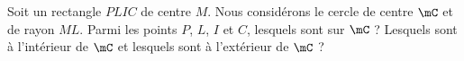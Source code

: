 
\begin{exercice}\label{exo2smath-0307}

    Soit un rectangle \( PLIC\) de centre \( M\). Nous considérons le cercle de centre \( \mC\) et de rayon \( ML\). Parmi les points \( P\), \( L\), \( I\) et \( C\), lesquels sont sur \( \mC\) ? Lesquels sont à l'intérieur de \( \mC\) et lesquels sont à l'extérieur de \( \mC\) ?

\end{exercice}
